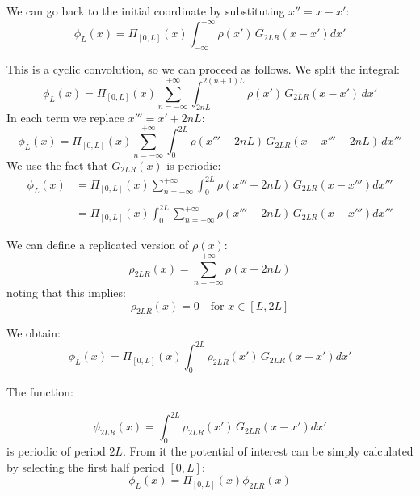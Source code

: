 We can go back to the initial coordinate by substituting $x'' = x-x'$:
\begin{equation}
\phi_L(x) = 
\Pi_{[0,L]}\left(x\right)
\int_{-\infty}^{+\infty} 
\rho(x')\,G_{2LR}(x-x') dx'
\end{equation}

This is a cyclic convolution, so we can proceed as follows. We split the integral:
\begin{equation}
\phi_L(x) = 
\Pi_{[0,L]}\left({x}\right)
\sum_{n=-\infty}^{+\infty}
\int_{2nL}^{2(n+1)L} 
\rho(x')\,G_{2LR}(x-x') \,dx'
\label{eq:conv3}
\end{equation}
In each term we replace $x''' = x'+2nL$:
\begin{equation}
\phi_L(x) = 
\Pi_{[0,L]}\left({x}\right)
\sum_{n=-\infty}^{+\infty}
\int_{0 }^{2L} 
\rho(x'''-2nL)\,G_{2LR}(x-x'''-2nL) \,dx'''
\label{eq:conv4}
\end{equation}
We use the fact that $G_{2LR}(x)$ is periodic:
\begin{equation}
\begin{split}
\phi_L(x) &= 
\Pi_{[0,L]}\left({x}\right)
\sum_{n=-\infty}^{+\infty}
\int_{0 }^{2L} 
\rho(x'''-2nL)\,G_{2LR}(x-x''') dx'''\\
\\&=
\Pi_{[0,L]}\left({x}\right)
\int_{0 }^{2L}  
\sum_{n=-\infty}^{+\infty}
\rho(x'''-2nL)\,G_{2LR}(x-x''') dx'''
\end{split}
\label{eq:conv5}
\end{equation}

We can define a replicated version of $\rho(x)$:
\begin{equation}
\rho_{2LR}(x)= \sum_{n=-\infty}^{+\infty}
\rho(x-2nL)
\end{equation}
noting that this implies:
\begin{equation}
\rho_{2LR}(x)= 0 \quad \text{for } x \in [L, 2L]
\label{eq:zeros}
\end{equation}

We obtain:
\begin{equation}
\phi_L(x) = 
\Pi_{[0,L]}\left({x}\right)
\int_{0 }^{2L} 
\rho_{2LR}(x')\,G_{2LR}(x-x') dx'
\label{eq:conv6}
\end{equation}

The function:

\begin{equation}
\phi_{2LR}(x) = 
\int_{0 }^{2L} 
\rho_{2LR}(x')\,G_{2LR}(x-x') dx'
\label{eq:confin}
\end{equation}
is periodic of period $2L$. From it the potential of interest can be simply calculated by selecting the first half period $[0, L]$:
\begin{equation}
\phi_L(x) = 
\Pi_{[0,L]}\left({x}\right)
\phi_{2LR}(x)
\label{eq:sel}
\end{equation}

